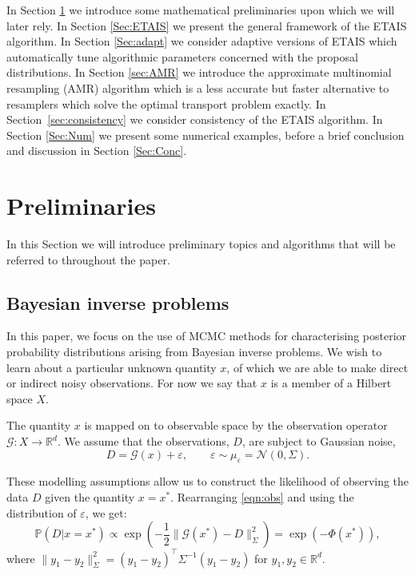 \documentclass[final]{siamltex}
\newcommand{\data}{D}
\begin{document}
In Section \ref{Sec:Prelim} we introduce some mathematical
preliminaries upon which we will later rely. In Section \ref{Sec:ETAIS}
we present the general framework of the ETAIS algorithm. In Section
\ref{Sec:adapt} we consider adaptive versions of ETAIS which
automatically tune algorithmic parameters concerned with the proposal
distributions. In Section \ref{sec:AMR} we introduce the approximate
multinomial resampling (AMR) algorithm which is a less accurate but
faster alternative to resamplers which solve the optimal transport
problem exactly. In Section~\ref{sec:consistency} we consider
consistency of the ETAIS algorithm. In Section \ref{Sec:Num} we present
some numerical examples, before a brief conclusion and discussion in
Section \ref{Sec:Conc}.


\section{Preliminaries}\label{Sec:Prelim}

In this Section we will introduce preliminary topics and algorithms
that will be referred to throughout the paper.


\subsection{Bayesian inverse problems}

In this paper, we focus on the use of MCMC methods for characterising
posterior probability distributions arising from Bayesian inverse problems. We
wish to learn about a particular unknown quantity $x$, of which we are
able to make direct or indirect noisy observations. For now
we say that $x$ is a member of a Hilbert
space $X$. 

The quantity $x$ is mapped on to observable space by the observation
operator $\mathcal{G}:X \to\mathbb{R}^d$. We assume that the
observations, $\data$, are subject to Gaussian noise,
\begin{equation}\label{eqn:obs}
	\data = \mathcal{G}(x) + \varepsilon, \qquad \varepsilon \sim \mu_{\varepsilon} = \mathcal{N}(0,\Sigma).
\end{equation}

These modelling assumptions allow us to construct the 
likelihood of observing the data $\data$ given the quantity $x =
x^*$. Rearranging \eqref{eqn:obs} and using the distribution of
$\varepsilon$, we get:
\begin{equation}\label{eqn:like}
	\mathbb{P}(\data|x=x^*) \propto \exp \left ( -\frac{1}{2} \|\mathcal{G}(x^*)
	  - \data\|_\Sigma^2 \right ) = \exp\left(-\Phi(x^*)\right),
\end{equation}
where $\| y_1 - y_2 \|^2_\Sigma = (y_1-y_2)^\top\Sigma^{-1}(y_1-y_2)$
for $y_1,y_2 \in \mathbb{R}^d$.
\end{document}
